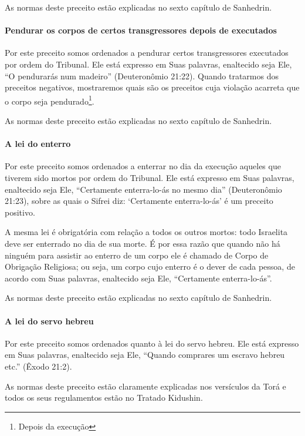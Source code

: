 As normas deste preceito estão explicadas no sexto capítulo de Sanhedrin.


\paragraph{Pendurar os corpos de certos transgressores depois de executados}

Por este preceito somos ordenados a pendurar certos transgressores
executados por ordem do Tribunal. Ele está expresso em Suas palavras,
enaltecido seja Ele, ``O pendurarás num madeiro'' (Deuteronômio 21:22).
Quando tratarmos dos preceitos negativos, mostraremos quais são os
preceitos cuja violação acarreta que o corpo seja
pendurado\footnote{Depois da execução}.

As normas deste preceito estão explicadas no sexto capítulo de Sanhedrin.

\paragraph{A lei do enterro}

Por este preceito somos ordenados a enterrar no dia da execução aqueles
que tiverem sido mortos por ordem do Tribunal. Ele está expresso em Suas
palavras, enaltecido seja Ele, ``Certamente enterra-lo-ás no mesmo dia''
(Deuteronômio 21:23), sobre as quais o Sifrei diz: `Certamente
enterra-lo-ás' é um preceito positivo.

A mesma lei é obrigatória com relação a todos os outros mortos: todo
Israelita deve ser enterrado no dia de sua morte. É por essa razão que
quando não há ninguém para assistir ao enterro de um corpo ele é
chamado de Corpo de Obrigação Religiosa; ou seja, um corpo cujo enterro
é o dever de cada pessoa, de acordo com Suas palavras, enaltecido seja
Ele, ``Certamente enterra-lo-ás''.

As normas deste preceito estão explicadas no sexto capítulo de Sanhedrin.

\paragraph{A lei do servo hebreu}

Por este preceito somos ordenados quanto à lei do servo hebreu. Ele está
expresso em Suas palavras, enaltecido seja Ele, ``Quando comprares um
escravo hebreu etc.'' (Êxodo 21:2).

As normas deste preceito estão claramente explicadas nos versículos da
Torá e todos os seus regulamentos estão no Tratado Kidushin.

